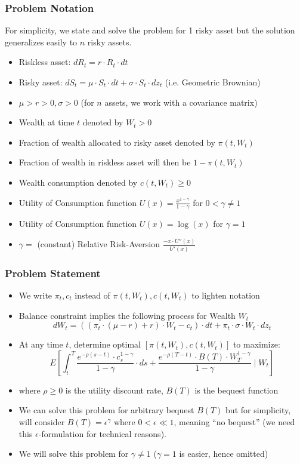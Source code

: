 \documentclass{beamer}
\begin{document}
\begin{frame}
\frametitle{Problem Notation}
For simplicity, we state and solve the problem for 1 risky asset but the solution generalizes easily to $n$ risky assets.
\begin{itemize}
\item Riskless asset: $dR_t = r \cdot R_t \cdot dt$
\item Risky asset: $dS_t = \mu \cdot S_t \cdot dt + \sigma \cdot S_t \cdot dz_t$ (i.e. Geometric Brownian)
\item $\mu > r > 0, \sigma > 0$ (for $n$ assets, we work with a covariance matrix)
\item Wealth at time $t$ denoted by $W_t > 0$
\item Fraction of wealth allocated to risky asset denoted by $\pi(t, W_t)$
\item Fraction of wealth in riskless asset will then be $1 - \pi(t, W_t)$
\item Wealth consumption denoted by $c(t, W_t) \geq 0$
\item Utility of Consumption function $U(x) = \frac {x^{1-\gamma}} {1 - \gamma}$ for $0 < \gamma \neq 1$
\item Utility of Consumption function $U(x) = \log(x)$ for $\gamma = 1$
\item $\gamma =$ (constant) Relative Risk-Aversion $\frac {-x \cdot U''(x)} {U'(x)}$
\end{itemize}
\end{frame}

\begin{frame}
\frametitle{Problem Statement}
\begin{itemize}
\item We write $\pi_t, c_t$ instead of $\pi(t, W_t), c(t, W_t)$ to lighten notation
\item Balance constraint implies the following process for Wealth $W_t$
$$dW_t = ((\pi_t \cdot (\mu - r) + r) \cdot W_t - c_t) \cdot dt + \pi_t \cdot \sigma \cdot W_t \cdot dz_t$$
\item At any time $t$, determine optimal $[\pi(t,W_t), c(t, W_t)]$ to maximize:
$$E[\int_t^T \frac {e^{-\rho (s-t)} \cdot c_s^{1-\gamma}} {1-\gamma} \cdot ds + \frac {e^{-\rho (T-t)} \cdot B(T) \cdot W_T^{1-\gamma}} {1-\gamma} \mid W_t]$$
\item where $\rho \geq 0$ is the utility discount rate, $B(T)$ is the bequest function
\item We can solve this problem for arbitrary bequest $B(T)$ but for simplicity, will consider $B(T) = \epsilon^{\gamma}$
where $0 < \epsilon \ll 1$, meaning ``no bequest'' (we need this $\epsilon$-formulation for technical reasons).
\item We will solve this problem for $\gamma \neq 1$ ($\gamma = 1$ is easier, hence omitted)
\end{itemize}
\end{frame}
\end{document}
